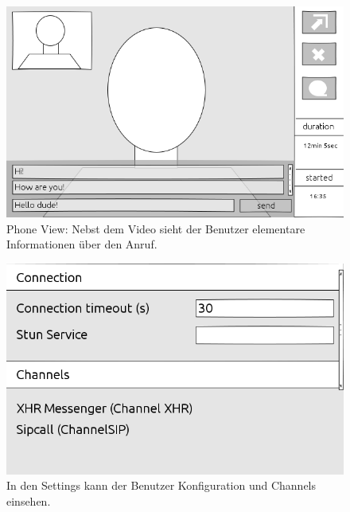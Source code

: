 	\begin{figure}[H]
		\centering
		\includegraphics[height=0.4\textheight]{../ui/img/uiDraft2/PhoneViewWithMessenger.png}
		\caption[Call screen draft2]{Phone View: Nebst dem Video sieht der Benutzer elementare Informationen über den Anruf.}
		\label{settings screen}
	\end{figure}
	\begin{figure}[H]
		\centering
		\includegraphics[height=0.4\textheight]{../ui/img/uiDraft2/SettingsView.png}
		\caption[Settings screen draft2]{In den Settings kann der Benutzer Konfiguration und Channels einsehen.}
		\label{settings screen}
	\end{figure}
	
